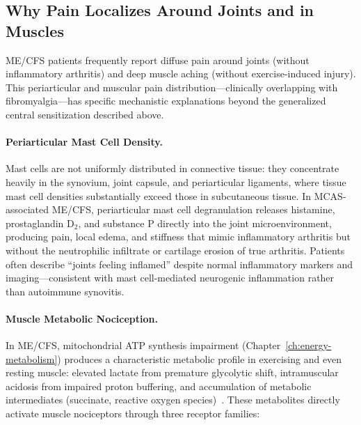 \subsection{Why Pain Localizes Around Joints and in Muscles}
\label{subsec:ch15-joint-muscle-pain}

ME/CFS patients frequently report diffuse pain around joints (without inflammatory arthritis) and deep muscle aching (without exercise-induced injury). This periarticular and muscular pain distribution---clinically overlapping with fibromyalgia---has specific mechanistic explanations beyond the generalized central sensitization described above.

\paragraph{Periarticular Mast Cell Density.}
Mast cells are not uniformly distributed in connective tissue: they concentrate heavily in the synovium, joint capsule, and periarticular ligaments, where tissue mast cell densities substantially exceed those in subcutaneous tissue. In MCAS-associated ME/CFS, periarticular mast cell degranulation releases histamine, prostaglandin D$_2$, and substance P directly into the joint microenvironment, producing pain, local edema, and stiffness that mimic inflammatory arthritis but without the neutrophilic infiltrate or cartilage erosion of true arthritis. Patients often describe ``joints feeling inflamed'' despite normal inflammatory markers and imaging---consistent with mast cell-mediated neurogenic inflammation rather than autoimmune synovitis.

\paragraph{Muscle Metabolic Nociception.}
In ME/CFS, mitochondrial ATP synthesis impairment (Chapter~\ref{ch:energy-metabolism}) produces a characteristic metabolic profile in exercising and even resting muscle: elevated lactate from premature glycolytic shift, intramuscular acidosis from impaired proton buffering, and accumulation of metabolic intermediates (succinate, reactive oxygen species)~\cite{Lien2019lactate, Jammes2021muscle}. These metabolites directly activate muscle nociceptors through three receptor families:


